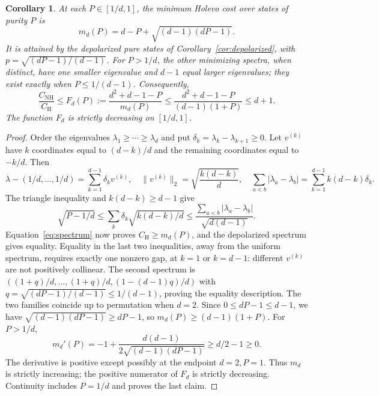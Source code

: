 \documentclass[11pt]{article}
\newcommand{\CH}{C_{\mathrm H}}
\newcommand{\CN}{C_{\mathrm{NH}}}
\newtheorem{corollary}[theorem]{Corollary}
\begin{document}
\begin{corollary}\label{cor:fixedpurity}
At each $P\in[1/d,1]$, the minimum Holevo cost over states of purity $P$ is
\begin{equation}\label{eq:envelope}
 m_d(P)=d-P+\sqrt{(d-1)(dP-1)}.
\end{equation}
It is attained by the depolarized pure states of
Corollary~\ref{cor:depolarized}, with $p=\sqrt{(dP-1)/(d-1)}$.
For $P>1/d$, the other minimizing spectra, when distinct, have one smaller
eigenvalue and $d-1$ equal larger eigenvalues; they exist exactly when
$P\leq1/(d-1)$. Consequently,
\begin{equation}\label{eq:sharpratio}
 \frac{\CN}{\CH}\leq F_d(P):=
 \frac{d^2+d-1-P}{m_d(P)}
 \leq \frac{d^2+d-1-P}{(d-1)(1+P)}\leq d+1.
\end{equation}
The function $F_d$ is strictly decreasing on $[1/d,1]$.
\end{corollary}
\begin{proof}
Order the eigenvalues $\lambda_1\geq\cdots\geq\lambda_d$ and put
$\delta_k=\lambda_k-\lambda_{k+1}\geq0$.
Let $v^{(k)}$ have $k$ coordinates equal to $(d-k)/d$ and the remaining
coordinates equal to $-k/d$. Then
\[
 \lambda-(1/d,\ldots,1/d)=\sum_{k=1}^{d-1}\delta_kv^{(k)},\quad
 \|v^{(k)}\|_2=\sqrt{\frac{k(d-k)}d},\quad
 \sum_{a<b}|\lambda_a-\lambda_b|=\sum_{k=1}^{d-1}k(d-k)\delta_k.
\]
The triangle inequality and $k(d-k)\geq d-1$ give
\[
 \sqrt{P-1/d}\leq\sum_k\delta_k\sqrt{k(d-k)/d}
 \leq\frac{\sum_{a<b}|\lambda_a-\lambda_b|}{\sqrt{d(d-1)}}.
\]
Equation~\eqref{eq:spectrum} now proves $\CH\geq m_d(P)$, and the
depolarized spectrum gives equality. Equality in the last two inequalities,
away from the uniform spectrum, requires exactly one nonzero gap, at
$k=1$ or $k=d-1$: different $v^{(k)}$ are not positively collinear.
The second spectrum is
$( (1+q)/d,\ldots,(1+q)/d,(1-(d-1)q)/d )$ with
$q=\sqrt{(dP-1)/(d-1)}\leq1/(d-1)$, proving the equality description.
The two families coincide up to permutation when $d=2$.
Since $0\leq dP-1\leq d-1$, we have
$\sqrt{(d-1)(dP-1)}\geq dP-1$, so
$m_d(P)\geq(d-1)(1+P)$.
For $P>1/d$,
\[
 m_d'(P)=-1+\frac{d(d-1)}{2\sqrt{(d-1)(dP-1)}}\geq d/2-1\geq0.
\]
The derivative is positive except possibly at the endpoint $d=2,P=1$.
Thus $m_d$ is strictly increasing; the positive numerator of $F_d$ is
strictly decreasing. Continuity includes $P=1/d$ and proves the last claim.
\end{proof}
\end{document}
